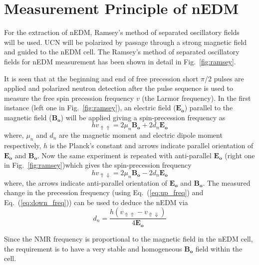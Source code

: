\section{Measurement Principle of nEDM}\label{sec:nEDM}

For the extraction of nEDM, Ramsey's method of separated oscillatory fields~\cite{ramsey} will be used. UCN will be polarized by passage through a strong magnetic field and guided to the nEDM cell. The Ramsey's method of separated oscillatory fields for nEDM measurement has been shown in detail in Fig.~\ref{fig:ramsey}. 


\FloatBarrier

It is seen that at the beginning and end of free precession short $\pi$/2 pulses are applied and polarized neutron detection after the pulse sequence is used to measure the free spin precession frequency $v$ (the Larmor frequency). In the first instance (left one in Fig.~\ref{fig:ramsey}), an electric field ($\bm{E_o}$) parallel to the magnetic field ($\bm{B_o}$) will be applied giving a spin-precession frequency as
\begin{equation}\label{eq:up_freq}
    h v_{\Uparrow \Uparrow}=2\mu_n\bm{B_o}+2 d_n\bm{E_o}
\end{equation}
where, $\mu_n$ and $d_n$ are the magnetic moment and electric dipole moment respectively, $h$ is the Planck's constant and arrows indicate parallel orientation of $\bm{E_o}$ and $\bm{B_o}$.
Now the same experiment is repeated with anti-parallel $\bm{E_o}$ (right one in Fig.~\ref{fig:ramsey})which gives the spin-precession frequency
\begin{equation}\label{eq:down_freq}
    h v_{\Uparrow \Downarrow}=2\mu_n\bm{B_o}-2 d_n\bm{E_o}
\end{equation}
where, the arrows indicate anti-parallel orientation of $\bm{E_o}$ and $\bm{B_o}$.
The measured change in the precession frequency (using Eq.~(\ref{eq:up_freq}) and Eq.~(\ref{eq:down_freq})) can be used to deduce the nEDM via
\begin{equation}\label{eq:nEDM}
    d_n=\frac{h (v_{\Uparrow \Uparrow}-v_{\Uparrow \Downarrow})}{4\bm{E_o}}
\end{equation}

Since the NMR frequency is proportional to the magnetic field in the nEDM cell, the requirement is to have a very stable and homogeneous $\bm{B_o}$ field within the cell.


